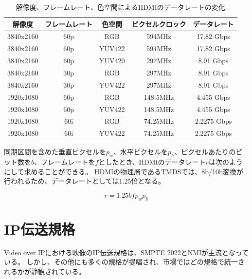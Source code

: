 \begin{table}[htbp]
  \caption{解像度、フレームレート、色空間によるHDMIのデータレートの変化}
  \label{tb:video-bandwidth}
  \begin{center}
  \begin{tabular}{c|c|c|c|c}
    \hline
    解像度     & フレームレート & 色空間  & ピクセルクロック & データレート  \\\hline\hline
    3840x2160 & 60p          & RGB    & 594MHz        & 17.82 Gbps  \\\hline
    3840x2160 & 60p          & YUV422 & 594MHz        & 17.82 Gbps  \\\hline
    3840x2160 & 60p          & YUV420 & 297MHz        & 8.91 Gbps   \\\hline
    3840x2160 & 30p          & RGB    & 297MHz        & 8.91 Gbps   \\\hline
    3840x2160 & 30p          & YUV422 & 297MHz        & 8.91 Gbps   \\\hline
    1920x1080 & 60p          & RGB    & 148.5MHz      & 4.455 Gbps  \\\hline
    1920x1080 & 60p          & YUV422 & 148.5MHz      & 4.455 Gbps  \\\hline
    1920x1080 & 60i          & RGB    & 74.25MHz      & 2.2275 Gbps \\\hline
    1920x1080 & 60i          & YUV422 & 74.25MHz      & 2.2275 Gbps \\\hline
  \end{tabular}\end{center}
\end{table}


同期区間を含めた垂直ピクセルを$p_w$、水平ピクセルを$p_h$、ピクセルあたりのビット数を$b$、フレームレートを$f$としたとき、HDMIのデータレート$r$は次のようにして求めることができる。
HDMIの物理層であるTMDSでは、8b/10b変換が行われるため、データレートとしては1.25倍となる。

\[ r=1.25bfp_wp_h \]

\section{IP伝送規格}
Video over IPにおける映像のIP伝送規格は、SMPTE 2022とNMIが主流となっている\cite{kodera-interbee2016}。
しかし、その他にも多くの規格が提唱され、市場ではどの規格で統一されるかが静観されている。

